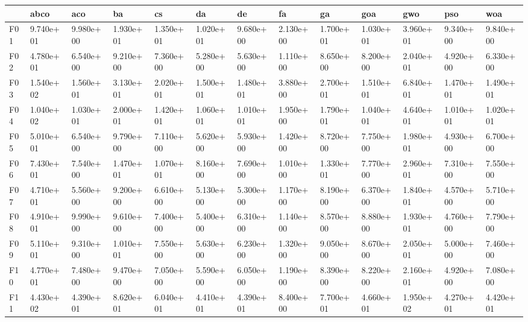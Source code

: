\begin{table}
    \centering
    \begin{adjustbox}{width=\linewidth}
        \begin{tabular}{lllllllllllll}
            \toprule
            {}   & abco      & aco       & ba        & cs        & da        & de        & fa        & ga        & goa       & gwo       & pso       & woa       \\
            \midrule
            F01  & 9.740e+01 & 9.980e+00 & 1.930e+01 & 1.350e+01 & 1.020e+01 & 9.680e+00 & 2.130e+00 & 1.700e+01 & 1.030e+01 & 3.960e+01 & 9.340e+00 & 9.840e+00 \\
            F02  & 4.780e+01 & 6.540e+00 & 9.210e+00 & 7.360e+00 & 5.280e+00 & 5.630e+00 & 1.110e+00 & 8.650e+00 & 8.200e+00 & 2.040e+01 & 4.920e+00 & 6.330e+00 \\
            F03  & 1.540e+02 & 1.560e+01 & 3.130e+01 & 2.020e+01 & 1.500e+01 & 1.480e+01 & 3.880e+00 & 2.700e+01 & 1.510e+01 & 6.840e+01 & 1.470e+01 & 1.490e+01 \\
            F04  & 1.040e+02 & 1.030e+01 & 2.000e+01 & 1.420e+01 & 1.060e+01 & 1.010e+01 & 1.950e+00 & 1.790e+01 & 1.040e+01 & 4.640e+01 & 1.010e+01 & 1.020e+01 \\
            F05  & 5.010e+01 & 6.540e+00 & 9.790e+00 & 7.110e+00 & 5.620e+00 & 5.930e+00 & 1.420e+00 & 8.720e+00 & 7.750e+00 & 1.980e+01 & 4.930e+00 & 6.700e+00 \\
            F06  & 7.430e+01 & 7.540e+00 & 1.470e+01 & 1.070e+01 & 8.160e+00 & 7.690e+00 & 1.010e+00 & 1.330e+01 & 7.770e+00 & 2.960e+01 & 7.310e+00 & 7.550e+00 \\
            F07  & 4.710e+01 & 5.560e+00 & 9.200e+00 & 6.610e+00 & 5.130e+00 & 5.300e+00 & 1.170e+00 & 8.190e+00 & 6.370e+00 & 1.840e+01 & 4.570e+00 & 5.710e+00 \\
            F08  & 4.910e+01 & 9.990e+00 & 9.610e+00 & 7.400e+00 & 5.400e+00 & 6.310e+00 & 1.140e+00 & 8.570e+00 & 8.880e+00 & 1.930e+01 & 4.760e+00 & 7.790e+00 \\
            F09  & 5.110e+01 & 9.310e+00 & 1.010e+01 & 7.550e+00 & 5.630e+00 & 6.230e+00 & 1.320e+00 & 9.050e+00 & 8.670e+00 & 2.050e+01 & 5.000e+00 & 7.460e+00 \\
            F10  & 4.770e+01 & 7.480e+00 & 9.470e+00 & 7.050e+00 & 5.590e+00 & 6.050e+00 & 1.190e+00 & 8.390e+00 & 8.220e+00 & 2.160e+01 & 4.920e+00 & 7.080e+00 \\
            F11  & 4.430e+02 & 4.390e+01 & 8.620e+01 & 6.040e+01 & 4.410e+01 & 4.390e+01 & 8.400e+00 & 7.700e+01 & 4.660e+01 & 1.950e+02 & 4.270e+01 & 4.420e+01 \\

\end{tabular}
\end{adjustbox}
\end{table}
